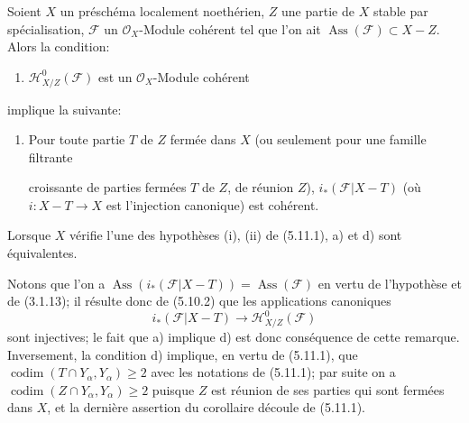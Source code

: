 \begin{corollary}[5.11.5]
\label{IV.2.s5.11.5-fr}
Soient $X$ un préschéma localement noethérien, $Z$ une partie de $X$ stable par
spécialisation, $\mathcal F$ un $\mathcal O_X$-Module cohérent tel que l'on ait
$\operatorname{Ass}(\mathcal F)\subset X-Z$. Alors la condition:
\begin{enumerate}
\item[a)] $\mathcal H^0_{X/Z}(\mathcal F)$ est un $\mathcal O_X$-Module
cohérent
\end{enumerate}
implique la suivante:
\begin{enumerate}
\item[d)] Pour toute partie $T$ de $Z$ fermée dans $X$ (ou seulement pour une
famille filtrante


croissante de parties fermées $T$ de $Z$, de réunion $Z$),
$i_*(\mathcal F\vert X-T)$ (où $i:X-T\to X$ est l'injection canonique) est
cohérent.
\end{enumerate}
Lorsque $X$ vérifie l'une des hypothèses (i), (ii) de (5.11.1), a) et d) sont
équivalentes.
\end{corollary}

Notons que l'on a
$\operatorname{Ass}(i_*(\mathcal F\vert X-T))=\operatorname{Ass}(\mathcal F)$
en vertu de l'hypothèse et de (3.1.13); il résulte donc de (5.10.2) que les
applications canoniques
\[
i_*(\mathcal F\vert X-T)\longrightarrow\mathcal H^0_{X/Z}(\mathcal F)
\]
sont injectives; le fait que a) implique d) est donc conséquence de cette
remarque. Inversement, la condition d) implique, en vertu de (5.11.1), que
$\operatorname{codim}(T\cap Y_\alpha,Y_\alpha)\geq2$ avec les notations de
(5.11.1); par suite on a
$\operatorname{codim}(Z\cap Y_\alpha,Y_\alpha)\geq2$ puisque $Z$ est réunion
de ses parties qui sont fermées dans $X$, et la dernière assertion du
corollaire découle de (5.11.1).


